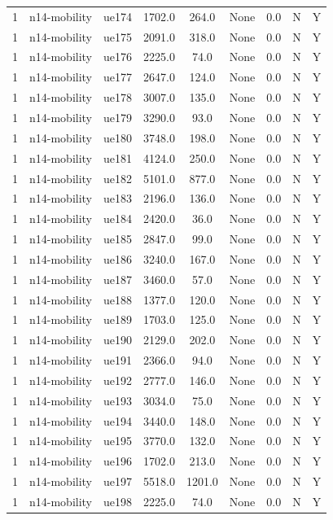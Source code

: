 \begin{table}[ht]
\begin{tabular}{|c|c|c|c|c|c|c|c|c|}
1 & n14-mobility & ue174 & 1702.0 & 264.0 & None & 0.0 & N & Y \\
1 & n14-mobility & ue175 & 2091.0 & 318.0 & None & 0.0 & N & Y \\
1 & n14-mobility & ue176 & 2225.0 & 74.0 & None & 0.0 & N & Y \\
1 & n14-mobility & ue177 & 2647.0 & 124.0 & None & 0.0 & N & Y \\
1 & n14-mobility & ue178 & 3007.0 & 135.0 & None & 0.0 & N & Y \\
1 & n14-mobility & ue179 & 3290.0 & 93.0 & None & 0.0 & N & Y \\
1 & n14-mobility & ue180 & 3748.0 & 198.0 & None & 0.0 & N & Y \\
1 & n14-mobility & ue181 & 4124.0 & 250.0 & None & 0.0 & N & Y \\
1 & n14-mobility & ue182 & 5101.0 & 877.0 & None & 0.0 & N & Y \\
1 & n14-mobility & ue183 & 2196.0 & 136.0 & None & 0.0 & N & Y \\
1 & n14-mobility & ue184 & 2420.0 & 36.0 & None & 0.0 & N & Y \\
1 & n14-mobility & ue185 & 2847.0 & 99.0 & None & 0.0 & N & Y \\
1 & n14-mobility & ue186 & 3240.0 & 167.0 & None & 0.0 & N & Y \\
1 & n14-mobility & ue187 & 3460.0 & 57.0 & None & 0.0 & N & Y \\
1 & n14-mobility & ue188 & 1377.0 & 120.0 & None & 0.0 & N & Y \\
1 & n14-mobility & ue189 & 1703.0 & 125.0 & None & 0.0 & N & Y \\
1 & n14-mobility & ue190 & 2129.0 & 202.0 & None & 0.0 & N & Y \\
1 & n14-mobility & ue191 & 2366.0 & 94.0 & None & 0.0 & N & Y \\
1 & n14-mobility & ue192 & 2777.0 & 146.0 & None & 0.0 & N & Y \\
1 & n14-mobility & ue193 & 3034.0 & 75.0 & None & 0.0 & N & Y \\
1 & n14-mobility & ue194 & 3440.0 & 148.0 & None & 0.0 & N & Y \\
1 & n14-mobility & ue195 & 3770.0 & 132.0 & None & 0.0 & N & Y \\
1 & n14-mobility & ue196 & 1702.0 & 213.0 & None & 0.0 & N & Y \\
1 & n14-mobility & ue197 & 5518.0 & 1201.0 & None & 0.0 & N & Y \\
1 & n14-mobility & ue198 & 2225.0 & 74.0 & None & 0.0 & N & Y \\

\end{tabular}
\end{table}
